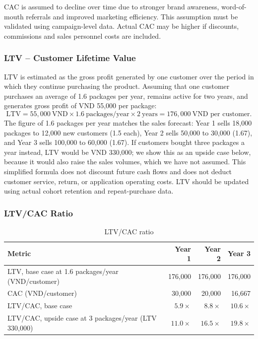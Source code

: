 CAC is assumed to decline over time due to stronger brand awareness,
word-of-mouth referrals and improved marketing efficiency. This assumption must be
validated using campaign-level data. Actual CAC may be higher if discounts,
commissions and sales personnel costs are included.

\subsubsection{LTV -- Customer Lifetime Value}
LTV is estimated as the gross profit generated by one customer over the period in
which they continue purchasing the product. Assuming that one customer purchases
an average of 1.6 packages per year, remains active for two years, and generates
gross profit of VND 55,000 per package:
\[
  \text{LTV} = 55{,}000\ \text{VND} \times 1.6\ \text{packages/year} \times 2\ \text{years}
  = 176{,}000\ \text{VND per customer}.
\]
The figure of 1.6 packages per year matches the sales forecast: Year 1 sells 18,000 packages to
12,000 new customers (1.5 each), Year 2 sells 50,000 to 30,000 (1.67), and Year 3 sells 100,000
to 60,000 (1.67). If customers bought three packages a year instead, LTV would be VND 330,000;
we show this as an upside case below, because it would also raise the sales volumes, which we
have not assumed. This simplified formula does not discount future cash flows and does not deduct
customer service, return, or application operating costs. LTV should be updated
using actual cohort retention and repeat-purchase data.

\subsubsection{LTV/CAC Ratio}
\begin{table}[ht]
\centering\small
\caption{LTV/CAC ratio}\label{tab:ltvcac}
\begin{tabular}{@{}L{6.2cm}rrr@{}}
  \toprule
  \textbf{Metric} & \textbf{Year 1} & \textbf{Year 2} & \textbf{Year 3}\\
  \midrule
  LTV, base case at 1.6 packages/year (VND/customer) & 176,000 & 176,000 & 176,000\\
  CAC (VND/customer) & 30,000 & 20,000 & 16,667\\
  LTV/CAC, base case & $5.9\times$ & $8.8\times$ & $10.6\times$\\
  LTV/CAC, upside case at 3 packages/year (LTV 330,000) & $11.0\times$ & $16.5\times$ & $19.8\times$\\
  \bottomrule
\end{tabular}
\end{table}

